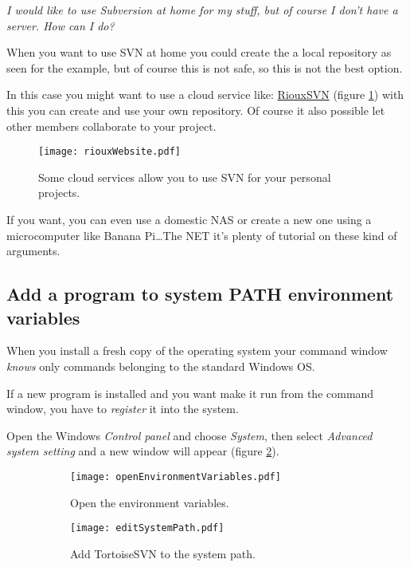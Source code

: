 \textit{I would like to use Subversion at home for my stuff, but of course I don't have a server. How can I do?}\newline

When you want to use SVN at home you could create the a local repository as seen for the example, but of course this is not safe, so this is not the best option.

In this case you might want to use a cloud service like: \href{https://riouxsvn.com/}{RiouxSVN} (figure \ref{fig:riouxWebsite}) with this you can create and use your own repository. Of course it also possible let other members collaborate to your project.



\begin{figure}[ht!]
    \centering
    \texttt{[image: riouxWebsite.pdf]}
    \caption{Some cloud services allow you to use SVN for your personal projects.}
    \label{fig:riouxWebsite}
\end{figure}

If you want, you can even use a domestic NAS or create a new one using a microcomputer like Banana Pi\ldots The NET it's plenty of tutorial on these kind of arguments.



\newpage

\subsection{Add a program to system PATH environment variables}
\label{subsection:systemPath}

When you install a fresh copy of the operating system your command window \textit{knows} only commands belonging to the standard Windows OS.

If a new program is installed and you want make it run from the command window, you have to \textit{register} it into the system.\newline

Open the Windows \textit{Control panel} and choose \textit{System}, then select \textit{Advanced system setting} and a new window will appear (figure \ref{fig:openEnvironmentVariables}).


\begin{figure}[htbp]
\begin{subfigure}{0.5\textwidth}
  \centering
  \texttt{[image: openEnvironmentVariables.pdf]}
  \caption{Open the environment variables.}
  \label{fig:openEnvironmentVariables}
\end{subfigure}%
\hspace{5mm}
\begin{subfigure}{0.5\textwidth}
  \centering
  \texttt{[image: editSystemPath.pdf]}
  \caption{Add TortoiseSVN to the system path.}
  \label{fig:editSystemPath}
\end{subfigure}
\caption{}
\label{fig:addPath}
\end{figure}





